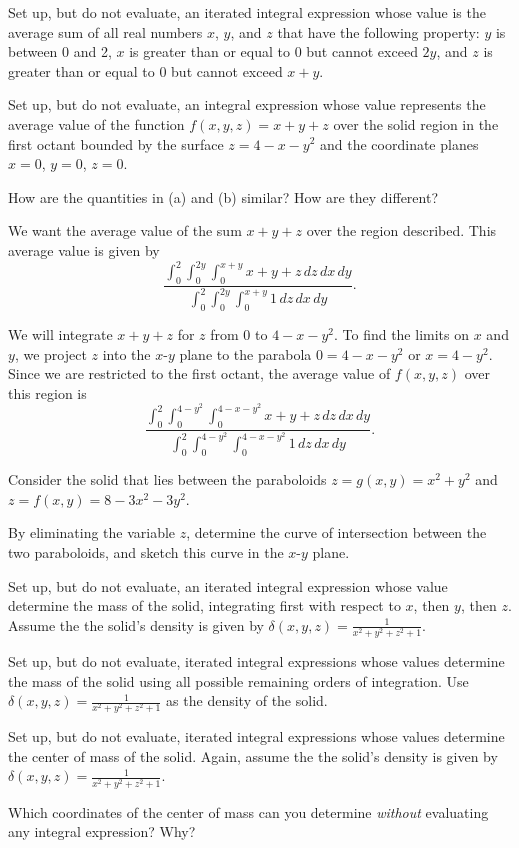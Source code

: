 \begin{exercises}
	\ba
		\item Set up, but do not evaluate, an iterated integral expression whose value is the average sum of all real numbers $x$, $y$, and $z$ that have the following property: $y$ is between 0 and 2, $x$ is greater than or equal to 0 but cannot exceed $2y$, and $z$ is greater than or equal to 0 but cannot exceed $x+y$.
		\item Set up, but do not evaluate, an integral expression whose value represents the average value of the function $f(x,y,z) = x + y + z$ over the solid region in the first octant bounded by the surface $z = 4 - x - y^2$ and the coordinate planes $x=0$, $y=0$, $z=0$. 
		\item How are the quantities in (a) and (b) similar?  How are they different?
	\ea
	
\begin{exerciseSolution}
\ba
\item We want the average value of the sum $x+y+z$ over the region described. This average value is given by 
\[\frac{\int_0^2 \int_0^{2y} \int_0^{x+y} x+y+z \, dz \, dx \, dy}{\int_0^2 \int_0^{2y} \int_0^{x+y} 1 \, dz \, dx \, dy}.\]
\item We will integrate $x+y+z$ for $z$ from $0$ to $4-x-y^2$. To find the limits on $x$ and $y$, we project $z$ into the $x$-$y$ plane to the parabola $0 = 4 - x- y^2$ or $x = 4-y^2$. Since we are restricted to the first octant, the average value of $f(x,y,z)$ over this region is 
\[\frac{\int_0^2 \int_0^{4-y^2} \int_0^{4-x-y^2} x+y+z \, dz \, dx \, dy}{\int_0^2 \int_0^{4-y^2} \int_0^{4-x-y^2} 1 \, dz \, dx \, dy}.\]
\ea
\end{exerciseSolution}

\item Consider the solid that lies between the paraboloids $z = g(x,y) = x^2 + y^2$ and $z = f(x,y) = 8 - 3x^2 - 3y^2$.

	\ba
		\item By eliminating the variable $z$, determine the curve of intersection between the two paraboloids, and sketch this curve in the $x$-$y$ plane.
		\item Set up, but do not evaluate, an iterated integral expression whose value determine the mass of the solid, integrating first with respect to $x$, then $y$, then $z$. Assume the the solid's density is given by $\delta(x,y,z) = \frac{1}{x^2 + y^2 + z^2 + 1}$.
		\item Set up, but do not evaluate, iterated integral expressions whose values determine the mass of the solid using all possible remaining orders of integration. Use $\delta(x,y,z) = \frac{1}{x^2 + y^2 + z^2 + 1}$ as the density of the solid.
		\item Set up, but do not evaluate, iterated integral expressions whose values determine the center of mass of the solid. Again, assume the the solid's density is given by $\delta(x,y,z) = \frac{1}{x^2 + y^2 + z^2 + 1}$.
		\item Which coordinates of the center of mass can you determine \emph{without} evaluating any integral expression?  Why?
	\ea


\end{exercises}
